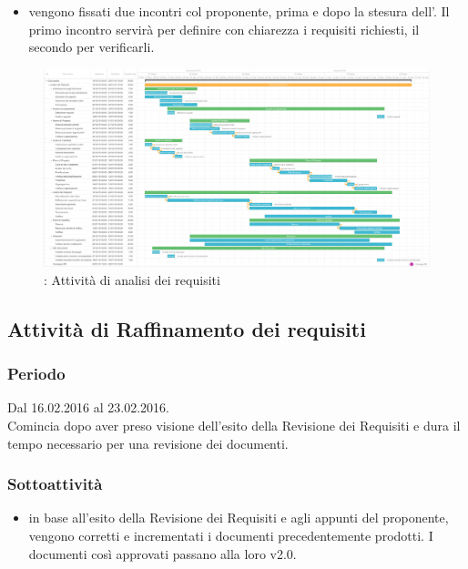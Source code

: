 \documentclass[a4paper, titlepage]{article}
\begin{document}
\begin{itemize}
		\item {} vengono fissati due incontri col proponente, prima e dopo la stesura dell'. Il primo incontro servirà per definire con chiarezza i requisiti richiesti, il secondo per verificarli.		 
	\end{itemize}
	
	\newpage
	\begin{figure}
		\includegraphics[scale=0.25]{Img/Grafici_Gantt/Analisi_dei_requisiti.pdf}
		\caption{ : Attività di analisi dei requisiti}
	\end{figure}
	
	\subsection{Attività di Raffinamento dei requisiti}
	\subsubsection{Periodo}
	Dal 16.02.2016 al 23.02.2016.\\
	Comincia dopo aver preso visione dell'esito della Revisione dei Requisiti e dura il tempo necessario per una revisione dei documenti.
	
	
	\subsubsection{Sottoattività}
	\begin{itemize}
		\item {} in base all'esito della Revisione dei Requisiti e agli appunti del proponente, vengono corretti e incrementati i documenti precedentemente prodotti. I documenti così approvati passano alla loro v2.0.
	\end{itemize}
	
\end{document}
